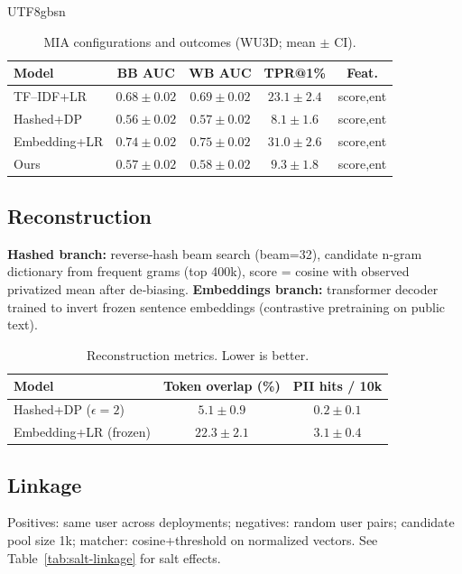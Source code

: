 \documentclass[acmsmall,natbib]{acmart}
\begin{document}
\begin{CJK*}{UTF8}{gbsn}
\begin{table}[h]
\centering
\caption{MIA configurations and outcomes (WU3D; mean $\pm$ CI).}
\label{tab:mia-config}
\setlength{\tabcolsep}{3.8pt}
\begin{tabular}{lcccc}
\toprule
\textbf{Model} & \textbf{BB AUC} & \textbf{WB AUC} & \textbf{TPR@1\%} & \textbf{Feat.} \\
\midrule
TF–IDF+LR & $0.68{\pm}0.02$ & $0.69{\pm}0.02$ & $23.1{\pm}2.4$ & score,ent \\
Hashed+DP & $0.56{\pm}0.02$ & $0.57{\pm}0.02$ & $8.1{\pm}1.6$ & score,ent \\
Embedding+LR & $0.74{\pm}0.02$ & $0.75{\pm}0.02$ & $31.0{\pm}2.6$ & score,ent \\
Ours & $0.57{\pm}0.02$ & $0.58{\pm}0.02$ & $9.3{\pm}1.8$ & score,ent \\
\bottomrule
\end{tabular}
\end{table}

\subsection{Reconstruction}
\textbf{Hashed branch:} reverse‑hash beam search (beam=32), candidate n‑gram dictionary from frequent grams (top 400k), score = cosine with observed privatized mean after de‑biasing.  
\textbf{Embeddings branch:} transformer decoder trained to invert frozen sentence embeddings (contrastive pretraining on public text).

\begin{table}[h]
\centering
\caption{Reconstruction metrics. Lower is better.}
\label{tab:recon}
\setlength{\tabcolsep}{5.2pt}
\begin{tabular}{lcc}
\toprule
\textbf{Model} & \textbf{Token overlap (\%)} & \textbf{PII hits / 10k} \\
\midrule
Hashed+DP ($\epsilon{=}2$) & $\mathbf{5.1}{\pm}0.9$ & $\mathbf{0.2}{\pm}0.1$ \\
Embedding+LR (frozen) & $22.3{\pm}2.1$ & $3.1{\pm}0.4$ \\
\bottomrule
\end{tabular}
\end{table}

\subsection{Linkage}
Positives: same user across deployments; negatives: random user pairs; candidate pool size 1k; matcher: cosine+threshold on normalized vectors. See Table~\ref{tab:salt-linkage} for salt effects.


\end{CJK*}
\end{document}
